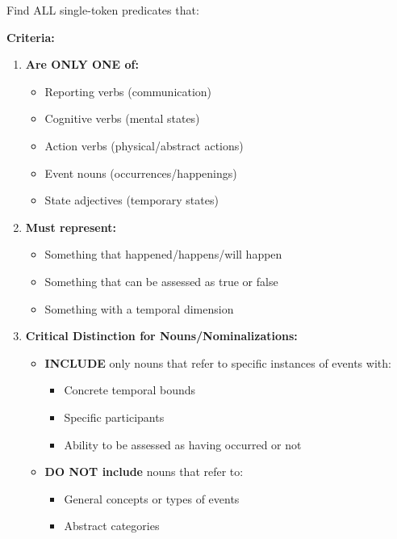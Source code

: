 \begin{figure*}[!ht]
\begin{tcolorbox}[
    width=\textwidth,
    colback=white,
    colframe=black,
    arc=4mm,
    boxrule=0.5pt,
    left=2mm,
    right=2mm,
    top=2mm,
    bottom=2mm,
    fonttitle=\bfseries,
    ]
\begin{tcolorbox}[
    colback=SeaGreen!8,
    boxrule=0pt,
    colframe=white,
    left=0pt,
    right=0pt,
    top=0pt,
    bottom=0pt,
    ]
Find ALL single-token predicates that:
\end{tcolorbox}
\begin{tcolorbox}[
    colback=Periwinkle!20,
    boxrule=0pt,
    colframe=white,
    left=0pt,
    right=0pt,
    top=0pt,
    bottom=0pt,
    ]
\small
\textbf{Criteria:}
\begin{enumerate}[noitemsep]
    \item \textbf{Are ONLY ONE of:}
    \begin{itemize}[noitemsep, leftmargin=15pt]
        \item Reporting verbs (communication)
        \item Cognitive verbs (mental states)
        \item Action verbs (physical/abstract actions)
        \item Event nouns (occurrences/happenings)
        \item State adjectives (temporary states)
    \end{itemize}
    \item \textbf{Must represent:}
    \begin{itemize}[noitemsep, leftmargin=15pt]
        \item Something that happened/happens/will happen
        \item Something that can be assessed as true or false
        \item Something with a temporal dimension
    \end{itemize}
    \item \textbf{Critical Distinction for Nouns/Nominalizations:}
    \begin{itemize}[noitemsep, leftmargin=15pt]
        \item \textbf{INCLUDE} only nouns that refer to specific instances of events with:
        \begin{itemize}[noitemsep, leftmargin=20pt]
            \item Concrete temporal bounds
            \item Specific participants
            \item Ability to be assessed as having occurred or not
        \end{itemize}
        \item \textbf{DO NOT include} nouns that refer to:
        \begin{itemize}[noitemsep, leftmargin=20pt]
            \item General concepts or types of events
            \item Abstract categories

\end{itemize}
\end{itemize}
\end{enumerate}
\end{tcolorbox}
\end{tcolorbox}
\end{figure*}
